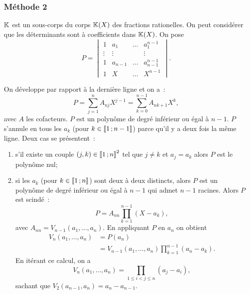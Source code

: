 \subsubsection{Méthode 2}

$\mathbb{K}$ est un sous-corps du corps $\mathbb{K}(X)$ des fractions rationelles. On peut considérer que les déterminants sont à coefficients dans $\mathbb{K}(X)$. On pose
\begin{equation}
  P = 
  \begin{vmatrix}
    1 & a_1 & \ldots & a_1^{n-1} \\
    \vdots & \vdots &  & \vdots \\
    1 & a_{n-1} & \ldots & a_{n-1}^{n-1}\\
    1 & X     & \ldots & X^{n-1}
  \end{vmatrix}.
\end{equation}

On développe par rapport à la dernière ligne et on a~:
\begin{equation}
  P = \sum_{j=1}^n A_{nj} X^{j-1}=\sum_{k=0}^{n-1} A_{n k+1} X^{k},
\end{equation}
avec $A$ les cofacteurs. $P$ est un polynôme de degré inférieur ou égal à $n-1$. $P$ s'annule en tous les $a_k$ (pour $k \in \mathopen{\llbracket}1\mathclose{}\mathpunct{};n-1\mathclose{\rrbracket}$) parce qu'il y a deux fois la même ligne. Deux cas se présentent~:
\begin{enumerate}
\item s'il existe un couple $(j,k) \in \mathopen{\llbracket}1\mathclose{}\mathpunct{};n\mathclose{\rrbracket}^2$ tel que $j \neq k$ et $a_j=a_k$ alors $P$ est le polynôme nul;
\item si les $a_k$ (pour $k \in \mathopen{\llbracket}1\mathclose{}\mathpunct{};n\mathclose{\rrbracket}$) sont deux à deux distincts, alors $P$ est un polynôme de degré inférieur ou égal à $n-1$ qui admet $n-1$ racines. Alors $P$ est scindé~:
  \begin{equation}
    P = A_{nn} \prod_{k=1}^{n-1}(X-a_k),
  \end{equation}
  avec $A_{nn} = V_{n-1}(a_1, \ldots, a_n)$. En appliquant $P$ en $a_n$ on obtient
  \begin{align}
    V_{n}(a_1, \ldots, a_n) &= P(a_n) \\
    &=V_{n-1}(a_1, \ldots, a_n) \prod_{k=1}^{n-1}(a_n-a_k).
  \end{align}
  En itérant ce calcul, on a
  \begin{equation}
    V_{n}(a_1, \ldots, a_n) = \prod_{1 \le i < j \leq n} (a_j-a_i),
  \end{equation}
  sachant que $V_2(a_{n-1},a_n)=a_n-a_{n-1}$.
\end{enumerate}

